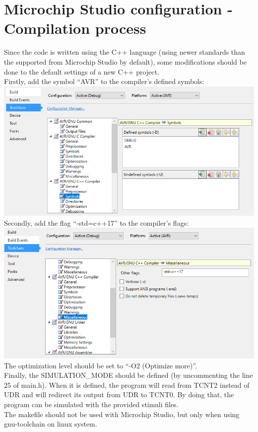 \documentclass[12pt, a4, hidelinks]{article}
\begin{document}
\section*{Microchip Studio configuration - Compilation process}
Since the code is written using the C++ language (using newer standards than the supported from Microchip Studio by default), some modifications should be done to the default settings of a new C++ project.  \\
Firstly, add the symbol ``AVR'' to the compiler’s defined symbols:\\
\includegraphics[scale=0.75]{CPP_AVR_SYMBOL.png} \\
Secondly, add the flag ``-std=c++17'' to the compiler’s flags:\\
\includegraphics[scale=0.75]{CPP_STD_17.png}  \\
The optimization level should be set to ``-O2 (Optimize more)''.\\
Finally, the SIMULATION\_MODE should be defined (by uncommenting the line 25 of main.h). When it is defined, the program will read from TCNT2 instead of UDR and will redirect its output from UDR to TCNT0. By doing that, the program can be simulated with the provided stimuli files. \\
The makefile should not be used with Microchip Studio, but only when using gnu-toolchain on linux system.
\end{document}
